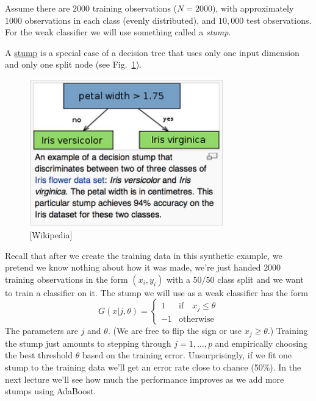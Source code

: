 \documentclass[a4paper]{article}
\begin{document}
Assume there are $2000$ training observations ($N=2000$), with approximately $1000$ observations in each class (evenly distributed), and $10,000$ test observations. For the weak classifier we will use something called a \textit{stump}.

\begin{definition}
A \underline{stump} is a special case of a decision tree that uses only one input dimension and only one split node (see Fig.~\ref{fig:stump}).
\end{definition}

\begin{figure}
\centering
\includegraphics[width=0.75\textwidth]{stump.png}
\caption{\label{fig:stump}[Wikipedia]}
\end{figure}

Recall that after we create the training data in this synthetic example, we pretend we know nothing about how it was made, we're just handed $2000$ training observations in the form $(x_i,y_i)$ with a $50/50$ class split and we want to train a classifier on it. The stump we will use as a weak classifier has the form
\begin{displaymath}
   G(x|j,\theta) = \left\{
     \begin{array}{lr}
       1 & \text{if}\quad x_j \leq \theta\\
       -1 & \text{otherwise}
     \end{array}
   \right.
\end{displaymath} 
The parameters are $j$ and $\theta$.  (We are free to flip the sign or use $x_j \geq \theta$.)  Training the stump just amounts to stepping through $j=1,\ldots,p$ and empirically choosing the best threshold $\theta$ based on the training error. Unsurprisingly, if we fit one stump to the training data we'll get an error rate close to chance (50\%).  In the next lecture we'll see how much the performance improves as we add more stumps using AdaBoost.
\end{document}
